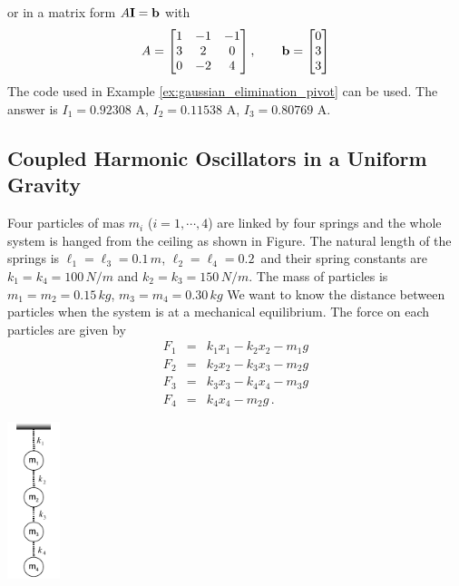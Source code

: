 \noindent
or in a matrix form $A \vb{I}=\vb{b}$ with
\begin{equation*}
A = \begin{bmatrix} 1 & -1 & -1 \\ 3 & 2 & 0 \\ 0& -2 & 4\end{bmatrix}, \qquad 
\vb{b}=\begin{bmatrix} 0 \\ 3 \\ 3 \end{bmatrix}
\end{equation*}
The code used in Example \ref{ex:gaussian_elimination_pivot} can be used.  The answer is
$I_1=0.92308$ A, $I_2= 0.11538$ A, $I_3=0.80769$ A.
 
\subsection{Coupled Harmonic Oscillators in a Uniform Gravity}

\begin{minipage}{5.3in}
Four particles of mas $m_i$ ($i=1,\cdots, 4$) are linked by four springs and the whole system is hanged from the ceiling as shown in Figure. The natural length of the springs is $\ell_1=\ell_3=0.1\, m$, $\ell_2=\ell_4=0.2\,$ and their spring constants are
$k_1=k_4=100\, N/m$ and $k_2=k_3=150\, N/m$.  The mass of particles is $m_1=m_2=0.15\, kg$, $m_3=m_4=0.30\, kg$  We want to know the distance between particles when the system is at a mechanical equilibrium.
The force on each particles are given by
\begin{subequations}
\begin{eqnarray}
F_1 &=& k_1 x_1 - k_2 x_2 - m_1 g\\
F_2 &=& k_2 x_2 - k_3 x_3 - m_2 g\\
F_3 &=& k_3 x_3 - k_4 x_4 - m_3 g\\
F_4 &=& k_4 x_4 -m_2 g\, .
\end{eqnarray}
\end{subequations}
\end{minipage}
\hfill
\begin{minipage}{1in}
\hfill\includegraphics[width=0.6in]{08.matrix1/vertical_chain.pdf}
\end{minipage}

